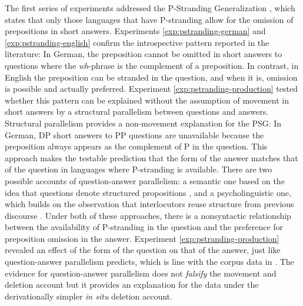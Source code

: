 The first series of experiments addressed the P-Stranding Generalization \citep{merchant2001,merchant2004}, which states that only those languages that have P-stranding allow for the omission of prepositions in short answers. Experiments \ref{exp:pstranding-german} and \ref{exp:pstranding-english} confirm the introspective pattern reported in the literature: In German, the preposition cannot be omitted in short answers to questions where the \textit{wh}-phrase is the complement of a preposition. In contrast, in English the preposition can be stranded in the question, and when it is, omission is possible and actually preferred. Experiment \ref{exp:pstranding-production} tested whether this pattern can be explained without the assumption of movement in short answers by a structural parallelism between questions and answers. Structural parallelism provides a non-movement explanation for the PSG: In German, DP short answers to PP questions are unavailable because the preposition always appears as the complement of P in the question. This approach makes the testable prediction that the form of the answer matches that of the question in languages where P-stranding is available. There are two possible accounts of question-answer parallelism: a semantic one based on the idea that questions denote structured propositions \citep{reich2002}, and a psycholinguistic one, which builds on the observation that interlocutors reuse structure from previous discourse \citep{levelt.kelter1982}. Under both of these approaches, there is a nonsyntactic relationship between the availability of P-stranding in the question and the preference for preposition omission in the answer. Experiment \ref{exp:pstranding-production} revealed an effect of the form of the question on that of the answer, just like question-answer parallelism predicts, which is line with the corpus data in \citet{nykiel2017}. The evidence for question-answer parallelism does not \textit{falsify} the movement and deletion account but it provides an explanation for the data under the derivationally simpler \textit{in situ} deletion account.


